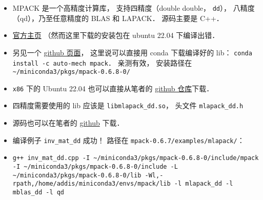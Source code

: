 
\begin{issues}
\issueDraft
\end{issues}

\begin{itemize}
\item MPACK 是一个高精度计算库， 支持四精度（double double， \verb|dd|）， 八精度（qd），乃至任意精度的 BLAS 和 LAPACK． 源码主要是 C++．
\item \href{https://mplapack.sourceforge.net/}{官方主页} （然而这里下载的安装包在 ubuntu 22.04 下编译出错．
\item 另见一个 \href{https://github.com/Auto-Mech/MPACK}{github 页面}， 这里说可以直接用 conda 下载编译好的 lib： \verb|conda install -c auto-mech mpack|． 亲测有效， 安装路径在 \verb|~/miniconda3/pkgs/mpack-0.6.8-0/|
\item \verb|x86| 下的 Ubuntu 22.04 也可以直接从笔者的 \href{https://github.com/MacroUniverse/MPACK-source}{github 仓库}下载．
\item 四精度需要使用的 lib 应该是 \verb|libmlapack_dd.so|， 头文件 \verb|mlapack_dd.h|
\item 源码也可以在笔者的 \href{https://github.com/MacroUniverse/MPACK-source}{github} 下载．
\item 编译例子 \verb|inv_mat_dd| 成功！ 路径在 \verb|mpack-0.6.7/examples/mlapack/|：
\item \verb|g++ inv_mat_dd.cpp -I ~/miniconda3/pkgs/mpack-0.6.8-0/include/mpack -I ~/miniconda3/pkgs/mpack-0.6.8-0/include -L ~/miniconda3/pkgs/mpack-0.6.8-0/lib -Wl,-rpath,/home/addis/miniconda3/envs/mpack/lib -l mlapack_dd -l mblas_dd -l qd|
\end{itemize}

